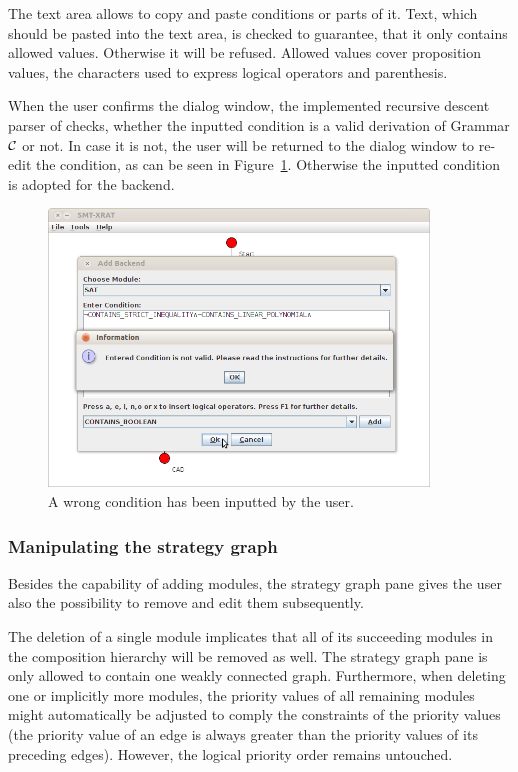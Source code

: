 The text area allows to copy and paste conditions or parts of it. Text, which should
be pasted into the text area, is checked to guarantee, that it only contains allowed
values. Otherwise it will be refused. Allowed values cover proposition values, the
characters used to express logical operators and parenthesis.

When the user confirms the dialog window, the implemented recursive descent parser of
\smtxrat checks, whether the inputted condition is a valid derivation of Grammar
$\cal C$ or not. In case it is not, the user will be returned to the dialog window
to re-edit the condition, as can be seen in Figure~\ref{fig:smt-xrat_condition_wrong}.
Otherwise the inputted condition is adopted for the backend.

\begin{figure}[ht]
  \begin{center}
    \includegraphics[width=0.9\textwidth]{graphics/smt-xrat_condition_wrong.png}
  \end{center}
  \caption{A wrong condition has been inputted by the user.}
  \label{fig:smt-xrat_condition_wrong}
\end{figure}

\subsubsection{Manipulating the strategy graph}
\label{sec:manipulating_the_strategy_graph}
Besides the capability of adding modules, the strategy graph pane gives the user
also the possibility to remove and edit them subsequently.

The deletion of a single module implicates that all of its succeeding modules in
the composition hierarchy will be removed as well. The strategy graph pane is only
allowed to contain one weakly connected graph. Furthermore, when deleting
one or implicitly more modules, the priority values of all remaining modules might
automatically be adjusted to comply the constraints of the priority values (the priority
value of an edge is always greater than the priority values of its preceding edges).
However, the logical priority order remains untouched.

